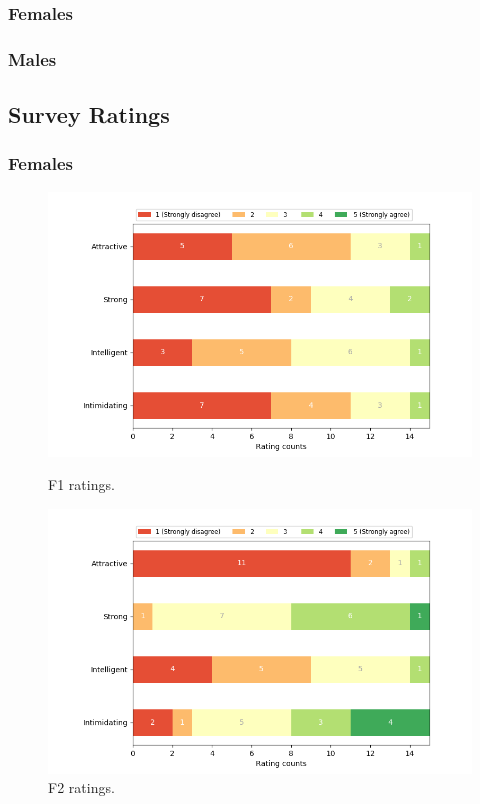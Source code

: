\subsubsection{Females}

\subsubsection{Males}

\subsection{Survey Ratings}
\label{subsection:ratings}
\subsubsection{Females}
\begin{figure}[H]
  \includegraphics[width=\linewidth]{Survey/FRatings/avatar_f1.png}
  \caption{F1 ratings.}
\endminipage\hfill
{}
  \includegraphics[width=\linewidth]{Survey/FRatings/avatar_f2.png}
  \caption{F2 ratings.}
\endminipage\hfill
\end{figure}
